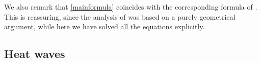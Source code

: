 \documentclass[a4paper, amsfonts, amssymb, amsmath, reprint, showkeys, nofootinbib, twoside,notitlepage,onecolumn]{revtex4-2}
\newcommand{\q}{{\mathfrak{q}}}
\theoremstyle{definition}
\theoremstyle{theorem}
\theoremstyle{corollary}
\begin{document}
We also remark that \eqref{mainformula} coincides with the corresponding formula of \cite{GavassinoShearRadiation2024jej}. This is reassuring, since the analysis of \cite{GavassinoShearRadiation2024jej} was based on a purely geometrical argument, while here we have solved all the equations explicitly.





\subsection{Heat waves}\label{heattoneee}
\end{document}
